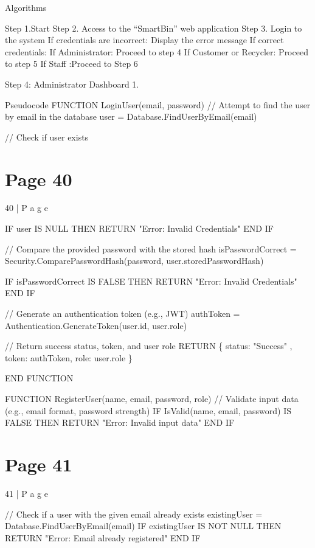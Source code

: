 \documentclass{article}
\begin{document}
Algorithms 
 
Step 1.Start 
Step 2. Access to the “SmartBin” web application 
Step 3. Login to the system 
  If credentials are incorrect: Display the error message  
 If correct credentials: 
  If Administrator: Proceed to step 4 
  If Customer or Recycler: Proceed to step 5 
  If Staff :Proceed to Step 6 
 
Step 4: Administrator Dashboard 
1.  
 
 
 
 
 
 
 
Pseudocode 
FUNCTION LoginUser(email, password) 
    // Attempt to find the user by email in the database 
    user = Database.FindUserByEmail(email) 
 
    // Check if user exists 

\section*{Page 40}
40 | P a g e 
 
    IF user IS NULL THEN 
        RETURN "Error: Invalid Credentials" 
    END IF 
 
    // Compare the provided password with the stored hash 
    isPasswordCorrect = Security.ComparePasswordHash(password, 
user.storedPasswordHash) 
 
    IF isPasswordCorrect IS FALSE THEN 
        RETURN "Error: Invalid Credentials" 
    END IF 
 
    // Generate an authentication token (e.g., JWT) 
    authToken = Authentication.GenerateToken(user.id, user.role) 
 
    // Return success status, token, and user role 
    RETURN \{ status: "Success" , token: authToken, role: user.role \} 
 
END FUNCTION 
 
FUNCTION RegisterUser(name, email, password, role) 
    // Validate input data (e.g., email format, password strength) 
    IF IsValid(name, email, password) IS FALSE THEN 
        RETURN "Error: Invalid input data" 
    END IF 
 

\section*{Page 41}
41 | P a g e 
 
    // Check if a user with the given email already exists 
    existingUser = Database.FindUserByEmail(email) 
    IF existingUser IS NOT NULL THEN 
        RETURN "Error: Email already registered" 
    END IF 
 
\end{document}
